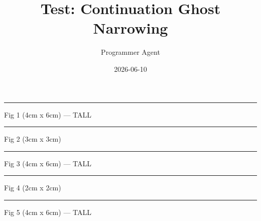 \documentclass[a4paper,11pt]{article}
\title{Test: Continuation Ghost Narrowing}
\author{Programmer Agent}
\date{2026-06-10}
\begin{document}
\maketitle

\begin{swarmwrap}%
  \begin{minipage}[t]{4cm}
    \centering
    \rule{\linewidth}{6cm}
    {\footnotesize Fig 1 (4cm x 6cm) --- TALL}
  \end{minipage}%
\end{swarmwrap}%
\swarmwrapnext
\lipsum[1-5]%

\begin{swarmwrap}%
  \begin{minipage}[t]{3cm}
    \centering
    \rule{\linewidth}{3cm}
    {\footnotesize Fig 2 (3cm x 3cm)}
  \end{minipage}%
\end{swarmwrap}%
\swarmwrapnext
\lipsum[6-8]%

\begin{swarmwrap}%
  \begin{minipage}[t]{4cm}
    \centering
    \rule{\linewidth}{6cm}
    {\footnotesize Fig 3 (4cm x 6cm) --- TALL}
  \end{minipage}%
\end{swarmwrap}%
\swarmwrapnext
\lipsum[9-13]%

\begin{swarmwrap}%
  \begin{minipage}[t]{2cm}
    \centering
    \rule{\linewidth}{2cm}
    {\footnotesize Fig 4 (2cm x 2cm)}
  \end{minipage}%
\end{swarmwrap}%
\swarmwrapnext
\lipsum[14-16]%

\begin{swarmwrap}%
  \begin{minipage}[t]{4cm}
    \centering
    \rule{\linewidth}{6cm}
    {\footnotesize Fig 5 (4cm x 6cm) --- TALL}
  \end{minipage}%
\end{swarmwrap}%
\swarmwrapnext
\lipsum[17-21]%
\end{document}
